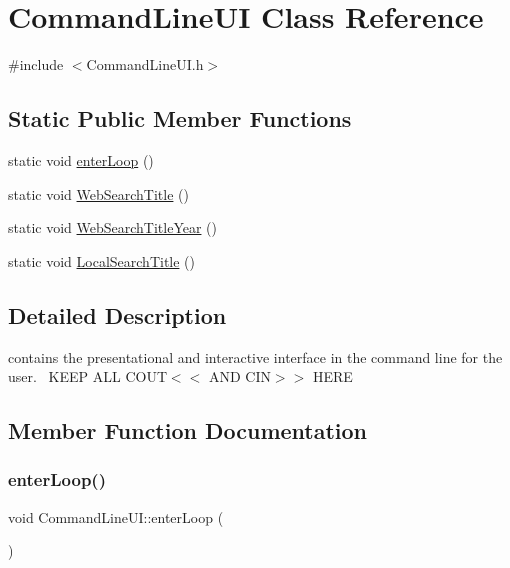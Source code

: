\hypertarget{class_command_line_u_i}{}\section{Command\+Line\+UI Class Reference}
\label{class_command_line_u_i}


{\ttfamily \#include $<$Command\+Line\+U\+I.\+h$>$}

\subsection*{Static Public Member Functions}
\begin{DoxyCompactItemize}
\item 
static void \hyperlink{class_command_line_u_i_ac72a09121b78bdf1ab1f457795fcf370}{enter\+Loop} ()
\item 
static void \hyperlink{class_command_line_u_i_acddc1d1d643322aa7885e758d9ba0258}{Web\+Search\+Title} ()
\item 
static void \hyperlink{class_command_line_u_i_a9aadc77fe37d190f9a3931c7babac900}{Web\+Search\+Title\+Year} ()
\item 
static void \hyperlink{class_command_line_u_i_aee2e35a46b0e08c2d63e4e560a2ac42e}{Local\+Search\+Title} ()
\end{DoxyCompactItemize}


\subsection{Detailed Description}
contains the presentational and interactive interface in the command line for the user.~\newline
K\+E\+EP A\+LL C\+O\+UT$<$$<$ A\+ND C\+IN$>$$>$ H\+E\+RE 

\subsection{Member Function Documentation}
\mbox{\label{class_command_line_u_i_ac72a09121b78bdf1ab1f457795fcf370}} 
\subsubsection{\texorpdfstring{enter\+Loop()}{enterLoop()}}
{\footnotesize\ttfamily void Command\+Line\+U\+I\+::enter\+Loop (\begin{DoxyParamCaption}{ }\end{DoxyParamCaption})\hspace{0.3cm}{\ttfamily [static]}}

